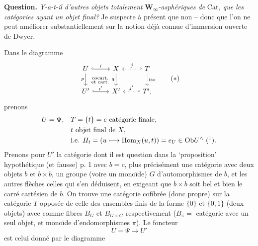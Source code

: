 \documentclass[11pt]{article}
\newcommand{\printedpage}[1]{\marginpar{\footnotesize p.~#1}}
\newcommand{\msp}[1]{\marginpar{\footnotesize [#1]}}
\newcommand{\Hom}{\mathrm{Hom}}
\newcommand{\Ob}{\mathrm{Ob}}
\newcommand{\Cat}{\mathrm{Cat}}
\begin{document}
\printedpage{4}

\msp{page 5}
\textbf{Question.} \textit{Y-a-t-il d'autres objets totalement} $\mathbf{W}_\infty$\textit{-asphériques de} $\Cat$\textit{, que les catégories ayant un objet final?} Je suspecte à présent que non -- donc que l'on ne peut améliorer substantiellement sur la notion déjà connue d'immersion ouverte de Dwyer.

Dans le diagramme
\[
\begin{tikzcd}
U \arrow[r, hook, "i"] \arrow[d, "p"'] \arrow[dr, phantom, "\substack{\text{cocart.}\\ \text{et cart.}}"] & X \arrow[d, "q"'] & T \arrow[l, hook', dotted, "j"'] \arrow[d, dotted, "\text{iso}"] \\
U' \arrow[r, hook, "i'"] & X' & T', \arrow[l, hook', dotted, "j'"']
\end{tikzcd}
\tag*{$(*)$}
\]
prenons
\[
\begin{aligned}
U = \Psi, \quad & T = \{t\} = e \text{ catégorie finale,}\\
& t \text{ objet final de } X,\\
& \text{i.e. } H_t = (u\longmapsto \Hom_X(u,t)) = e_U \in \Ob U^\wedge \ \mbox{(\footnotemark)}.
\end{aligned}
\]
Prenons pour $U'$ la catégorie dont il est question dans la `proposition' hypothétique (et fausse) p. 1 avec $b = c$, plus précisément une catégorie avec deux objets $b$ et $b\times b$, un groupe (voire un monoïde) $G$ d'automorphismes de $b$, et les autres flèches celles qui s'en déduisent, en exigeant que $b\times b$ soit bel et bien le carré cartésien de $b$. On trouve une catégorie cofibrée (donc propre) sur la catégorie $T$ opposée de celle des ensembles finis de la forme $\{0\}$ et $\{0,1\}$ (deux objets) avec comme fibres $B_G$ et $B_{G\times G}$ respectivement ($B_\pi =$ catégorie avec un seul objet, et monoïde d'endomorphismes $\pi$). Le foncteur
\[
U = \Psi \longrightarrow U'
\]
est celui donné par le diagramme
\end{document}
